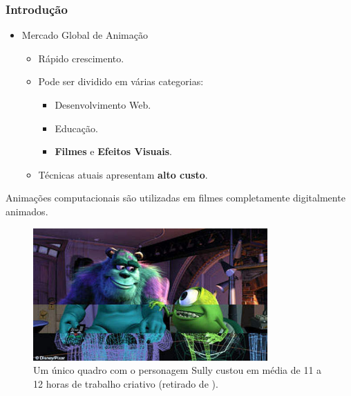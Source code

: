 \documentclass[brazil]{beamer}
\begin{document}
\begin{frame}[fragile]
  \frametitle{Introdução}

  \begin{itemize}
  	\item Mercado Global de Animação
  		\begin{itemize}
  			\item Rápido crescimento.
  			\item Pode ser dividido em várias categorias:
  			 \begin{itemize}
  				\item Desenvolvimento Web.
  				\item Educação.
  				\item \textbf{Filmes} e \textbf{Efeitos Visuais}. 
   				\end{itemize}
  				\item Técnicas atuais apresentam \textbf{alto custo}.
   		\end{itemize}
  

   \end{itemize}


\end{frame}


\begin{frame}
  Animações computacionais são utilizadas em filmes completamente digitalmente
  animados.
      \begin{figure}
        \centering
        \includegraphics[width = 0.8\textwidth, keepaspectratio]{./img/sully.jpg}
        \caption{Um único quadro com o personagem Sully custou em média de 11 a 12 horas de trabalho criativo (retirado de \cite{sullypixar}).}
      \end{figure}
\end{frame}

\end{document}
